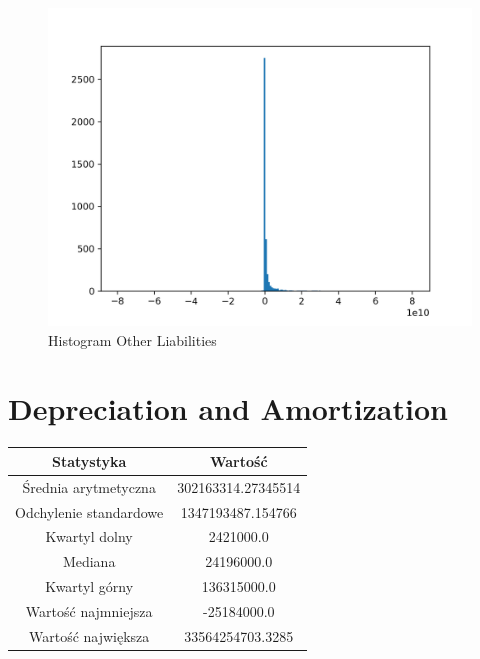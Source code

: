 \documentclass{article}
\begin{document}
\begin{figure}[h!]
    \includegraphics[width=\linewidth]{variables/Other Liabilities.png}
    \caption{Histogram Other Liabilities }
\end{figure}\section{ Depreciation and Amortization }

\begin{center}
    \begin{tabular}{|c | c|} 
    \hline
    Statystyka & Wartość \\
    \hline\hline
    Średnia arytmetyczna & 302163314.27345514 \\ 
    \hline
    Odchylenie standardowe & 1347193487.154766 \\
    \hline
    Kwartyl dolny & 2421000.0 \\
    \hline
    Mediana & 24196000.0 \\
    \hline
    Kwartyl górny & 136315000.0 \\
    \hline
    Wartość najmniejsza & -25184000.0 \\
    \hline
    Wartość największa & 33564254703.3285 \\
    \hline
   \end{tabular}
\end{center}
\end{document}
